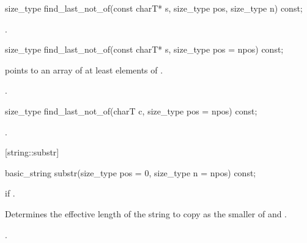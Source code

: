 %
%
\begin{itemdecl}
size_type find_last_not_of(const charT* s, size_type pos,
                           size_type n) const;
\end{itemdecl}

\begin{itemdescr}
\pnum
\returns
{}.
\end{itemdescr}

%
%
\begin{itemdecl}
size_type find_last_not_of(const charT* s, size_type pos = npos) const;
\end{itemdecl}

\begin{itemdescr}
\pnum
\requires {} points to an array of at least 
elements of .

\pnum
\returns
{}.
\end{itemdescr}

%
%
\begin{itemdecl}
size_type find_last_not_of(charT c, size_type pos = npos) const;
\end{itemdecl}

\begin{itemdescr}
\pnum
\returns
{}.
\end{itemdescr}

[string::substr]{}

%
%
\begin{itemdecl}
basic_string substr(size_type pos = 0, size_type n = npos) const;
\end{itemdecl}

\begin{itemdescr}
\pnum
\requires
{}

\pnum
\throws
{}
if
.

\pnum
\effects
Determines the effective length  of the string to copy as the smaller of  and
.

\pnum
\returns
{}.
\end{itemdescr}

